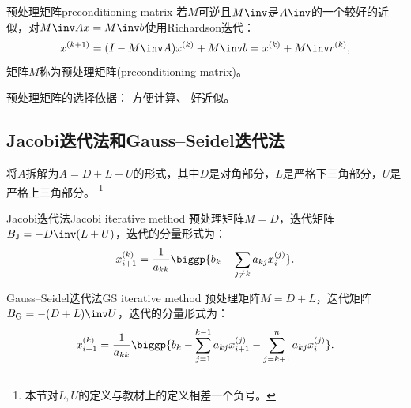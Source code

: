 \begin{definition}
    {预处理矩阵}{preconditioning matrix}
    若$M$可逆且$M\inv$是$A\inv$的一个较好的近似，对$M\inv Ax=M\inv b$使用Richardson迭代：
    \begin{equation}
        x^{(k+1)}=(I-M\inv A)x^{(k)}+M\inv b=x^{(k)}+M\inv r^{(k)},
    \end{equation}
    矩阵$M$称为预处理矩阵(preconditioning matrix)。
\end{definition}

\begin{remark}
    预处理矩阵的选择依据：
    方便计算、
    好近似。
\end{remark}

\subsection{Jacobi迭代法和Gauss--Seidel迭代法}

将$A$拆解为$A=D+L+U$的形式，其中$D$是对角部分，$L$是严格下三角部分，$U$是严格上三角部分。
\footnote{本节对$L,U$的定义与教材上的定义相差一个负号。}

\begin{example}
    {Jacobi迭代法}{Jacobi iterative method}
    预处理矩阵$M=D$，迭代矩阵$B_\text J=-D\inv(L+U)$，迭代的分量形式为：
    \begin{equation}
        x_{i+1}^{(k)}=\frac1{a_{kk}}\biggp{b_k-\sum_{j\neq k}a_{kj}x_i^{(j)}}.
    \end{equation}
\end{example}

\begin{example}
    {Gauss--Seidel迭代法}{GS iterative method}
    预处理矩阵$M=D+L$，迭代矩阵$B_\text G=-(D+L)\inv U$，迭代的分量形式为：
    \begin{equation}
        x_{i+1}^{(k)}=\frac1{a_{kk}}\biggp{b_k-\sum_{j=1}^{k-1}a_{kj}x_{i+1}^{(j)}-\sum_{j=k+1}^na_{kj}x_i^{(j)}}.
    \end{equation}
\end{example}

